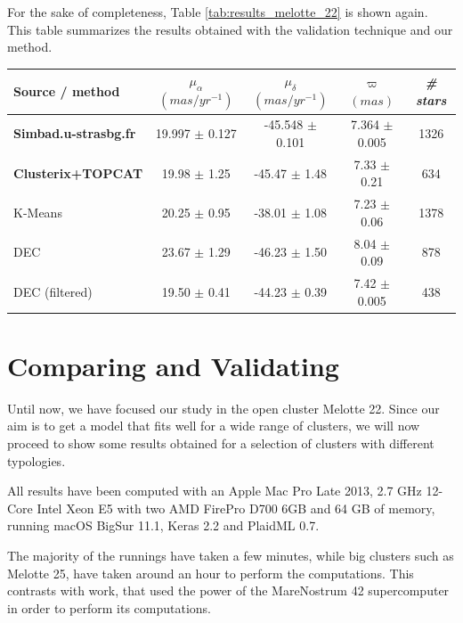 \documentclass[11pt, a4paper, english]{book}
\begin{document}
For the sake of completeness, Table \ref{tab:results_melotte_22} is shown again.
This table summarizes the results obtained with the validation technique and our method.

\begin{table}[h!]
  \begin{center}
    \begin{tabular}{l|c|c|c|c}
      \textbf{Source / method} & \emph{$\mu_{\alpha}$ $(mas/yr^{-1})$} & \emph{$\mu_{\delta}$ $(mas/yr^{-1})$} & \emph{$\varpi$ $(mas)$} & \emph{\# stars} \\
      \hline
      \textbf{Simbad.u-strasbg.fr} & 19.997 $\pm$ 0.127 & -45.548 $\pm$ 0.101 & 7.364 $\pm$ 0.005 & 1326 \\
      \textbf{Clusterix+TOPCAT} & 19.98 $\pm$ 1.25 & -45.47 $\pm$ 1.48 & 7.33 $\pm$ 0.21 & 634 \\
      K-Means & 20.25 $\pm$ 0.95 & -38.01 $\pm$ 1.08 & 7.23 $\pm$ 0.06 & 1378 \\
      DEC & 23.67 $\pm$ 1.29 & -46.23 $\pm$ 1.50 & 8.04 $\pm$ 0.09 & 878 \\
      DEC (filtered) & 19.50 $\pm$ 0.41 & -44.23 $\pm$ 0.39 & 7.42 $\pm$ 0.005 & 438 \\
    \end{tabular}
  \end{center}
\end{table}

\section{Comparing and Validating}
\label{sec:comparing_and_validating}

Until now, we have focused our study in the open cluster Melotte 22.
Since our aim is to get a model that fits well for a wide range of clusters,
we will now proceed to show some results obtained for a selection of clusters with different typologies.

All results have been computed with an Apple Mac Pro Late 2013,
2.7 GHz 12-Core Intel Xeon E5 with two AMD FirePro D700 6GB and 64 GB
of memory, running macOS BigSur 11.1, Keras 2.2 and PlaidML 0.7.

The majority of the runnings have taken a few minutes, while big clusters such as Melotte 25,
have taken around an hour to perform the computations.
This contrasts with  work,
that used the power of the MareNostrum 42 supercomputer in order to perform its computations.
\end{document}
